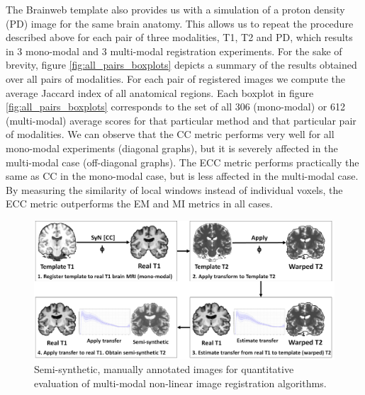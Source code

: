 The Brainweb template also provides us with a simulation of a proton density (PD) image for the same brain anatomy. This allows us to repeat the procedure described above for each pair of three modalities, T1, T2 and PD, which results in 3 mono-modal and 3 multi-modal registration experiments. For the sake of brevity, figure \ref{fig:all_pairs_boxplots} depicts a summary of the results obtained over all pairs of modalities. For each pair of registered images we compute the average Jaccard index of all anatomical regions. Each boxplot in figure \ref{fig:all_pairs_boxplots} corresponds to the set of all 306 (mono-modal) or 612 (multi-modal) average scores for that particular method and that particular pair of modalities. We can observe that the CC metric performs very well for all mono-modal experiments (diagonal graphs), but it is severely affected in the multi-modal case (off-diagonal graphs). The ECC metric performs practically the same as CC in the mono-modal case, but is less affected in the multi-modal case. By measuring the similarity of local windows instead of individual voxels, the ECC metric outperforms the EM and MI metrics in all cases.

\begin{figure}[H]
\centering
    \includegraphics[width=\linewidth]{./images/semi_synthetic_image_creation.png}
    \caption{Semi-synthetic, manually annotated images for quantitative evaluation of multi-modal non-linear image registration algorithms.}
\label{fig:semi_synthetic_image_creation}
\end{figure}

